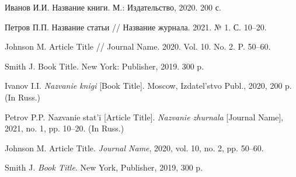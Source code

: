 \documentclass[12pt]{article}
\begin{document}
\bibliographyru

\bibliosectioncyrillic
\begin{bibliolist}
\item Иванов И.И. Название книги. М.: Издательство, 2020. 200 с.
\item Петров П.П. Название статьи // Название журнала. 2021. № 1. С. 10--20.
\end{bibliolist}

\bibliosectionlatin
\begin{bibliolist}
\item Johnson M. Article Title // Journal Name. 2020. Vol. 10. No. 2. P. 50--60.
\item Smith J. Book Title. New York: Publisher, 2019. 300 p.
\end{bibliolist}




\begin{bibliolist}
\item Ivanov I.I. \textit{Nazvanie knigi} [Book Title]. Moscow, Izdatel'stvo Publ., 2020, 200 p. (In Russ.)
\item Petrov P.P. Nazvanie stat'i [Article Title]. \textit{Nazvanie zhurnala} [Journal Name], 2021, no. 1, pp. 10--20. (In Russ.)
\item Johnson M. Article Title. \textit{Journal Name}, 2020, vol. 10, no. 2, pp. 50--60.
\item Smith J. \textit{Book Title}. New York, Publisher, 2019, 300 p.
\end{bibliolist}
\end{document}
